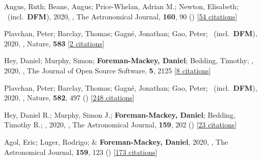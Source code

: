 \item[{\color{numcolor}\scriptsize58}] Angus, Ruth; Beane, Angus; Price-Whelan, Adrian M.; Newton, Elisabeth; \etal\ (incl.\ \textbf{DFM}), 2020, , The Astronomical Journal, \textbf{160}, 90 () [\href{https://ui.adsabs.harvard.edu/abs/2020AJ....160...90A}{54 citations}]

\item[{\color{numcolor}\scriptsize57}] Plavchan, Peter; Barclay, Thomas; Gagn{\'e}, Jonathan; Gao, Peter; \etal\ (incl.\ \textbf{DFM}), 2020, , Nature, \textbf{583} [\href{https://ui.adsabs.harvard.edu/abs/2020Natur.583E..31P}{2 citations}]

\item[{\color{numcolor}\scriptsize56}] Hey, Daniel; Murphy, Simon; \textbf{Foreman-Mackey, Daniel}; Bedding, Timothy; \etal, 2020, , The Journal of Open Source Software, \textbf{5}, 2125 [\href{https://ui.adsabs.harvard.edu/abs/2020JOSS....5.2125H}{8 citations}]

\item[{\color{numcolor}\scriptsize55}] Plavchan, Peter; Barclay, Thomas; Gagn{\'e}, Jonathan; Gao, Peter; \etal\ (incl.\ \textbf{DFM}), 2020, , Nature, \textbf{582}, 497 () [\href{https://ui.adsabs.harvard.edu/abs/2020Natur.582..497P}{248 citations}]

\item[{\color{numcolor}\scriptsize54}] Hey, Daniel R.; Murphy, Simon J.; \textbf{Foreman-Mackey, Daniel}; Bedding, Timothy R.; \etal, 2020, , The Astronomical Journal, \textbf{159}, 202 () [\href{https://ui.adsabs.harvard.edu/abs/2020AJ....159..202H}{23 citations}]

\item[{\color{numcolor}\scriptsize53}] Agol, Eric; Luger, Rodrigo; \& \textbf{Foreman-Mackey, Daniel}, 2020, , The Astronomical Journal, \textbf{159}, 123 () [\href{https://ui.adsabs.harvard.edu/abs/2020AJ....159..123A}{173 citations}]

